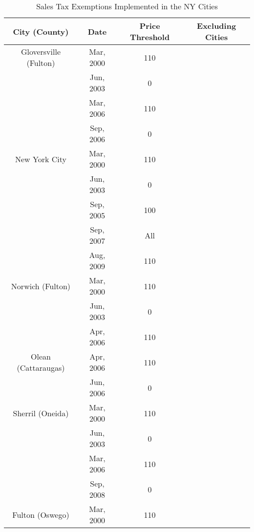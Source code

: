 \documentclass[12pt]{article}
\begin{document}
\begin{table}
	\caption{Sales Tax Exemptions Implemented in the NY Cities}
	\label{table:citexe}
	\centering
\begin{tabular}{|c|c|c|c|}
	\hline 
	City (County)	& Date   & Price Threshold & Excluding Cities   \\ 
	\hline 
	Gloversville (Fulton)	& Mar, 2000  &  110   &  \\ 
	& Jun, 2003  & 0     & \\ 
	& Mar, 2006  & 110    &   \\  
	& Sep, 2006  & 0    &  \\ \hline 
	New York City	& Mar, 2000  &  110   &  \\ 
	& Jun, 2003  & 0     & \\ 
	& Sep, 2005  & 100    &   \\  
	& Sep, 2007  & All    &  \\
	& Aug, 2009  & 110  & \\  \hline 
	Norwich (Fulton)	& Mar, 2000  &  110   &  \\ 
				& Jun, 2003  & 0     & \\ 
				& Apr, 2006  & 110    &   \\ \hline
	Olean (Cattaraugas)		& Apr, 2006  & 110     & \\ 
				& Jun, 2006  & 0    &   \\ \hline
	Sherril (Oneida)	& Mar, 2000  &  110   &  \\ 
	& Jun, 2003  & 0     & \\ 
	& Mar, 2006  & 110    &   \\  
	& Sep, 2008  & 0    &  \\ \hline
	Fulton (Oswego) & Mar, 2000  &  110   &  \\ \hline
\end{tabular} 
\end{table}	
\end{document}

